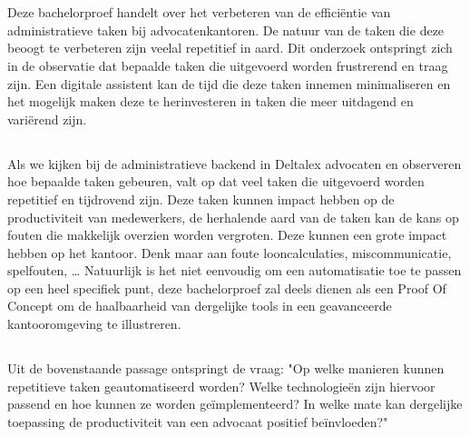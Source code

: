 
\chapter{}%
Deze bachelorproef handelt over het verbeteren van de efficiëntie van administratieve taken bij advocatenkantoren.
De natuur van de taken die deze beoogt te verbeteren zijn veelal repetitief in aard.
Dit onderzoek ontspringt zich in de observatie dat bepaalde taken die uitgevoerd worden frustrerend en traag zijn.
Een digitale assistent kan de tijd die deze taken innemen minimaliseren en het mogelijk maken deze te herinvesteren in taken die meer uitdagend en variërend zijn.

\section{}%
\label{sec:probleemstelling}

Als we kijken bij de administratieve backend in Deltalex advocaten en observeren hoe bepaalde taken gebeuren, valt op dat veel taken die uitgevoerd worden repetitief en tijdrovend zijn.
Deze taken kunnen impact hebben op de productiviteit van medewerkers, de herhalende aard van de taken kan de kans op fouten die makkelijk overzien worden vergroten.
Deze kunnen een grote impact hebben op het kantoor.
Denk maar aan foute looncalculaties, miscommunicatie, spelfouten, \dots
Natuurlijk is het niet eenvoudig om een automatisatie toe te passen op een heel specifiek punt, deze bachelorproef zal deels dienen als een Proof Of Concept om de haalbaarheid van
dergelijke tools in een geavanceerde kantooromgeving te illustreren.

\section{}%
\label{sec:onderzoeksvraag}

Uit de bovenstaande passage ontspringt de vraag:
"Op welke manieren kunnen repetitieve taken geautomatiseerd worden?
Welke technologieën zijn hiervoor passend en hoe kunnen ze worden geïmplementeerd?
In welke mate kan dergelijke toepassing de productiviteit van een advocaat positief beïnvloeden?"

